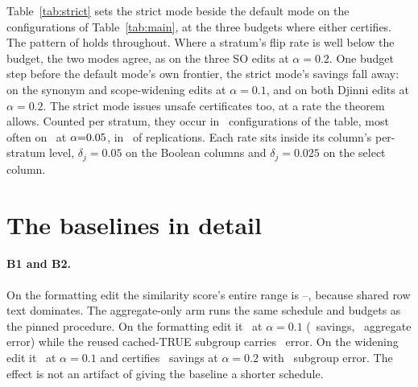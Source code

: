 Table~\ref{tab:strict} sets the strict mode beside the default mode on
the configurations of Table~\ref{tab:main}, at the three budgets where
either certifies. The pattern of  holds
throughout. Where a stratum's flip rate is well below the budget, the
two modes agree, as on the three SO edits at $\alpha{=}0.2$. One budget
step before the default mode's own frontier, the strict mode's savings
fall away: on the synonym and scope-widening edits at $\alpha{=}0.1$,
and on both Djinni edits at $\alpha{=}0.2$. The strict mode
issues unsafe certificates too, at a rate the theorem allows. Counted
per stratum, they occur in \strictUnsafeConfigs\ configurations of the
table, most often on \strictUnsafePair\ at
$\alpha{=}0.05$, in \strictUnsafeRate\ of replications.
Each rate sits inside its column's per-stratum level, $\delta_j{=}0.05$
on the Boolean columns and $\delta_j{=}0.025$ on the select column.

\begin{table}[t]
\caption{The default and strict modes on the five edit pairs:
certification rate and mean savings over \bootB\ replications, in
percent. Column \emph{unsafe} is the share of all replications in which
the strict mode issues an unsafe certificate, counted per stratum: one
for a stratum whose realized flip count exceeds $\alpha$ times the cells
it reuses, the event Theorem~\ref{thm:valid} bounds in that mode.}
\label{tab:strict}
\centering\footnotesize
\setlength{\tabcolsep}{4pt}

\end{table}

\FloatBarrier
\keepheading
\section{The baselines in detail}
\label{app:baselines}
\keeprunin
\paragraph{B1 and B2.} On the formatting edit the similarity score's
entire range is \simLo--\simHi, because shared row text dominates. The
aggregate-only arm runs the same schedule and budgets as the pinned
procedure. On the formatting edit it \aggTightCertF\ at $\alpha{=}0.1$
(\aggFtSavings\ savings, \aggFtRealized\ aggregate error) while the
reused cached-TRUE subgroup carries \aggFtSubgroup\ error. On the
widening edit it \aggTightCertW\ at $\alpha{=}0.1$ and certifies
\aggWsavings\ savings at $\alpha{=}0.2$ with \aggWsubgroup\ subgroup error. The
effect is not an artifact of giving the baseline a shorter schedule.

